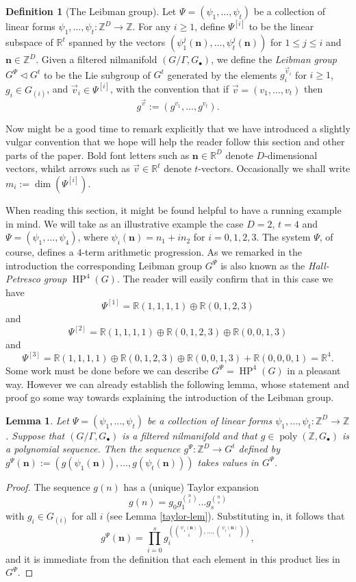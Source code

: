 \documentclass[11pt,reqno]{amsart}
\numberwithin{equation}{section}
\theoremstyle{plain}
\newtheorem{lemma}[subsection]{Lemma}
\theoremstyle{definition}
\newtheorem{definition}[subsection]{Definition}
\renewcommand{\leq}{\leqslant}
\renewcommand{\geq}{\geqslant}
\newcommand\Z{\mathbb{Z}}
\newcommand\R{\mathbb{R}}
\newcommand\1{{\bf 1}}
\newcommand\2{{\bf 2}}
\newcommand\HP{\operatorname{HP}}
\newcommand\poly{\operatorname{poly}}
\begin{document}
\begin{definition}[The Leibman group]  Let $\Psi = (\psi_1,\ldots,\psi_t)$ be a collection of linear forms $\psi_1,\ldots,\psi_t: \Z^D \to \Z$.  For any $i \geq 1$, define $\Psi^{[i]}$ to be the linear subspace of $\R^t$ spanned by the vectors $(\psi_1^j(\textbf{n}),\ldots,\psi_t^j(\textbf{n}))$ for $1 \leq j \leq i$ and $\textbf{n} \in \Z^D$. Given a filtered nilmanifold $(G/\Gamma, G_\bullet)$, we define the \emph{Leibman group} $G^{\Psi} \lhd G^t$ to be the Lie subgroup of $G^t$ generated by the elements $g_i^{\vec{v}_i}$ for $i \geq 1$, $g_i \in G_{(i)}$, and $\vec{v}_i \in {\Psi}^{[i]}$, with the convention that if $\vec{v} = (v_1,\dots,v_t)$ then
$$ g^{\vec{v}} := (g^{v_1},\ldots,g^{v_t}).$$ 
\end{definition}

Now might be a good time to remark explicitly that we have introduced a slightly vulgar convention that we hope will help the reader follow this section and other parts of the paper. Bold font letters such as $\mathbf{n} \in \R^D$ denote $D$-dimensional vectors, whilst arrows such as $\vec{v} \in \R^t$ denote $t$-vectors. Occasionally we shall write $m_i := \dim (\Psi^{[i]})$.

When reading this section, it might be found helpful to have a running example in mind. We will take as an illustrative example the case $D = 2$, $t = 4$ and $\Psi = (\psi_1,\dots,\psi_4)$, where $\psi_i(\mathbf{n}) = n_1 + in_2$ for $i = 0,1,2,3$. The system $\Psi$, of course, defines a $4$-term arithmetic progression. As we remarked in the introduction the corresponding Leibman group $G^{\Psi}$ is also known as the \emph{Hall-Petresco group} $\HP^4(G)$. The reader will easily confirm that in this case we have
\[ \Psi^{[1]} = \R (1,1,1,1) \oplus \R (0,1,2,3)\] and
\[ \Psi^{[2]} = \R(1,1,1,1) \oplus \R (0,1,2,3) \oplus \R(0,0,1,3)\]
and
\[ \Psi^{[3]} = \R(1,1,1,1) \oplus \R (0,1,2,3) \oplus \R(0,0,1,3) + \R(0,0,0,1) = \R^4.\]
Some work must be done before we can describe $G^{\Psi} = \HP^4(G)$ in a pleasant way. However we can already establish the following lemma, whose statement and proof go some way towards explaining the introduction of the Leibman group.

\begin{lemma}\label{motiv-lemma}
Let $\Psi = (\psi_1,\dots,\psi_t)$ be a collection of linear forms $\psi_1,\ldots,\psi_t: \Z^D \to \Z$. Suppose that $(G/\Gamma, G_{\bullet})$ is a filtered nilmanifold and that $g \in \poly(\Z,G_{\bullet})$ is a polynomial sequence. Then the sequence $g^{\Psi} : \Z^D \rightarrow G^t$ defined by $g^{\Psi}(\mathbf{n}) := (g(\psi_1(\mathbf{n})),\dots, g(\psi_t(\mathbf{n})))$ takes values in $G^{\Psi}$.
\end{lemma}
\begin{proof} The sequence $g(n)$ has a (unique) Taylor expansion 
\[ g(n) = g_0 g_1^{\binom{n}{1}} \dots g_s^{\binom{n}{s}}\] with $g_i \in G_{(i)}$ for all $i$ (see Lemma \ref{taylor-lem}). Substituting in, it follows that 
\[ g^{\Psi}(\mathbf{n}) = \prod_{i=0}^s g_i^{(\binom{\psi_1(\mathbf{n})}{i},\dots,\binom{\psi_t(\mathbf{n})}{i})},\] and it is immediate from the definition that each element in this product lies in $G^{\Psi}$.\end{proof}
\end{document}
